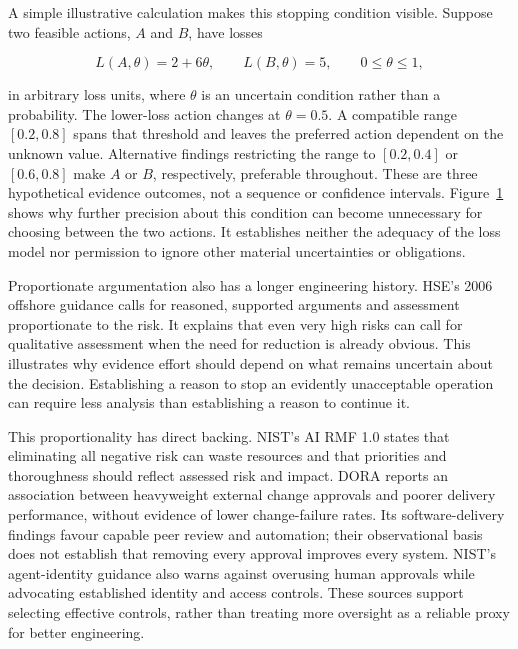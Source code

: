 \documentclass[11pt,a4paper]{article}
\begin{document}
\begin{samepage}
A simple illustrative calculation makes this stopping condition visible. Suppose two feasible actions, \(A\) and \(B\), have losses

\[
L(A,\theta)=2+6\theta,\qquad L(B,\theta)=5,\qquad 0\leq\theta\leq 1,
\]

in arbitrary loss units, where \(\theta\) is an uncertain condition rather than a probability. The lower-loss action changes at \(\theta=0.5\). A compatible range \([0.2,0.8]\) spans that threshold and leaves the preferred action dependent on the unknown value. Alternative findings restricting the range to \([0.2,0.4]\) or \([0.6,0.8]\) make \(A\) or \(B\), respectively, preferable throughout. These are three hypothetical evidence outcomes, not a sequence or confidence intervals. Figure~\ref{fig:decision-sufficiency} shows why further precision about this condition can become unnecessary for choosing between the two actions. It establishes neither the adequacy of the loss model nor permission to ignore other material uncertainties or obligations.

\end{samepage}
\begin{figure}[htbp]
\centering

\caption[Evidence sufficiency for a bounded choice]{}
\label{fig:decision-sufficiency}
\end{figure}

Proportionate argumentation also has a longer engineering history. HSE's 2006 offshore guidance calls for reasoned, supported arguments and assessment proportionate to the risk. It explains that even very high risks can call for qualitative assessment when the need for reduction is already obvious.\cite{hse} This illustrates why evidence effort should depend on what remains uncertain about the decision. Establishing a reason to stop an evidently unacceptable operation can require less analysis than establishing a reason to continue it.

This proportionality has direct backing. NIST's AI RMF 1.0 states that eliminating all negative risk can waste resources and that priorities and thoroughness should reflect assessed risk and impact.\cite{airmf} DORA reports an association between heavyweight external change approvals and poorer delivery performance, without evidence of lower change-failure rates. Its software-delivery findings favour capable peer review and automation; their observational basis does not establish that removing every approval improves every system.\cite{dora} NIST's agent-identity guidance also warns against overusing human approvals while advocating established identity and access controls.\cite{identity} These sources support selecting effective controls, rather than treating more oversight as a reliable proxy for better engineering.
\end{document}
